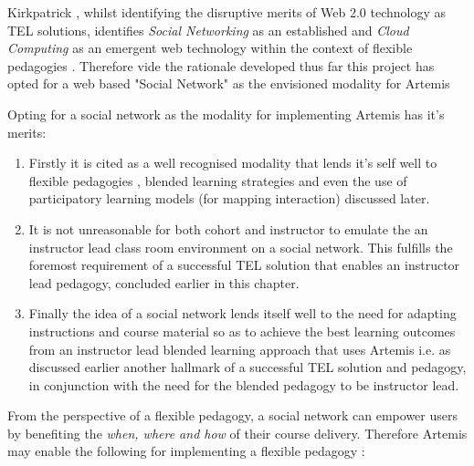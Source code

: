 Kirkpatrick , whilst identifying the disruptive merits of Web 2.0 technology as TEL solutions, identifies \textit{Social Networking} as an established and \textit{Cloud Computing} as an emergent web technology within the context of flexible pedagogies \cite{Burge2011}. Therefore vide the rationale developed thus far this project has opted for a web based "Social Network"  as the envisioned modality for Artemis

Opting for a social network as the modality for implementing Artemis has it's merits:

\begin{enumerate}
    \item Firstly it is cited as a well recognised modality that lends it's self well to flexible pedagogies \cite{Burge2011,Gordon2014}, blended learning strategies  and even the use of participatory learning models (for mapping interaction) \cite{Yager1990,Yager2004} discussed later.
    
    \item It is not unreasonable for both cohort and instructor to emulate the an instructor lead class room environment on a social network. This fulfills the foremost requirement of a successful TEL solution that enables an instructor lead pedagogy, concluded earlier in this chapter.
    
    \item Finally the idea of a social network lends itself well to the need for adapting instructions and course material so as to achieve the best learning outcomes from an instructor lead blended learning approach that uses Artemis i.e. as discussed earlier another hallmark of a successful TEL solution and pedagogy, in conjunction with the need for the blended pedagogy to be instructor lead.
\end{enumerate}

From the perspective of a flexible pedagogy, a social network can empower users by benefiting the \textit{when, where and how}\cite{Gordon2014} of their course delivery. Therefore Artemis may enable the following for implementing a flexible pedagogy \cite{Burge2011}:

